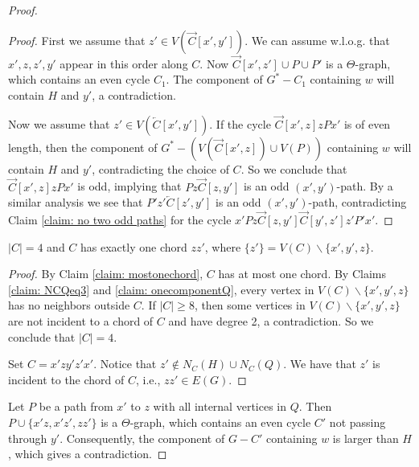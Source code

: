 \documentclass[10pt,a4paper]{amsart}
\begin{document}
\begin{proof}
\begin{proof}
        First we assume that $z'\in V(\overrightarrow{C}[x',y'])$. We can assume w.l.o.g. that $x',z,z',y'$ appear in this order along $C$. Now $\overrightarrow{C}[x',z']\cup P\cup P'$ is a $\varTheta$-graph, which contains an even cycle $C_1$. The component of $G^*-C_1$ containing $w$ will contain $H$ and $y'$, a contradiction.

        Now we assume that $z'\in V(\overleftarrow{C}[x',y'])$. If the cycle $\overrightarrow{C}[x',z]zPx'$ is of even length, then the component of $G^*-(V(\overrightarrow{C}[x',z])\cup V(P))$ containing $w$ will contain $H$ and $y'$, contradicting the choice of $C$. So we conclude that $\overrightarrow{C}[x',z]zPx'$ is odd, implying that $Pz\overrightarrow{C}[z,y']$ is an odd $(x',y')$-path. By a similar analysis we see that $P'z'\overleftarrow{C}[z',y']$ is an odd $(x',y')$-path, contradicting Claim \ref{claim: no two odd paths} for the cycle $x'Pz\overrightarrow{C}[z,y']\overrightarrow{C}[y',z']z'P'x'$.
    \end{proof}

    \begin{subclaim}\label{claim: Ceq4}
        $|C|=4$ and $C$ has exactly one chord $zz'$, where $\{z'\}=V(C)\backslash\{x',y',z\}$.
    \end{subclaim}

    \begin{proof}
        By Claim \ref{claim: mostonechord}, $C$ has at most one chord. By Claims \ref{claim: NCQeq3} and \ref{claim: onecomponentQ}, every vertex in $V(C)\backslash\{x',y',z\}$ has no neighbors outside $C$. If $|C|\geqslant 8$, then some vertices in $V(C)\backslash\{x',y',z\}$ are not incident to a chord of $C$ and have degree 2, a contradiction. So we conclude that $|C|=4$.
        
        Set $C=x'zy'z'x'$. Notice that $z'\notin N_C(H)\cup N_C(Q)$. We have that $z'$ is incident to the chord of $C$, i.e., $zz'\in E(G)$.
    \end{proof}

    
    Let $P$ be a path from $x'$ to $z$ with all internal vertices in $Q$. Then $P\cup \{x'z,x'z',zz'\}$ is a $\varTheta$-graph, which contains an even cycle $C'$ not passing through $y'$. Consequently, the component of $G - C'$ containing $w$ is larger than $H$, which gives a contradiction.
\end{proof}
\end{document}
